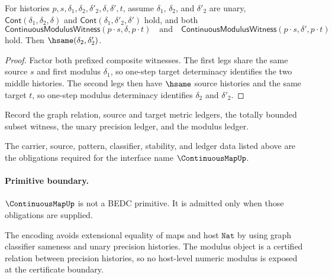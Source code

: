 \begin{theorem}
\label{thm:continuous-modulus-witness-prefixed-composite-second-deterministic}
For histories $p,s,\delta_1,\delta_2,\delta'_2,\delta,\delta',t$, assume
$\delta_1$, $\delta_2$, and $\delta'_2$ are unary,
$\mathsf{Cont}(\delta_1,\delta_2,\delta)$ and
$\mathsf{Cont}(\delta_1,\delta'_2,\delta')$ hold, and both
$$
\mathsf{ContinuousModulusWitness}(p\cdot s,\delta,p\cdot t)
\quad\text{and}\quad
\mathsf{ContinuousModulusWitness}(p\cdot s,\delta',p\cdot t)
$$
hold. Then $\hsame(\delta_2,\delta'_2)$.
\end{theorem}
\begin{proof}
Factor both prefixed composite witnesses. The first legs share the same source
$s$ and first modulus $\delta_1$, so one-step target determinacy identifies the
two middle histories. The second legs then have $\hsame$ source histories and
the same target $t$, so one-step modulus determinacy identifies $\delta_2$ and
$\delta'_2$.
\end{proof}



\begin{definition}
\label{def:continuous-ledger-policy}
Record the graph relation, source and target metric ledgers, the totally bounded subset witness, the unary precision ledger, and the modulus ledger.
\end{definition}

\begin{definition}
\label{def:continuous-certificate-obligations}
The carrier, source, pattern, classifier, stability, and ledger data listed above are the obligations required for the interface name $\ContinuousMapUp$.
\end{definition}
\paragraph{Primitive boundary.}
$\ContinuousMapUp$ is not a BEDC primitive. It is admitted only when those obligations are supplied.

\begin{remark}
\label{rem:continuous-zero-axiom-note}
The encoding avoids extensional equality of maps and host $\texttt{Nat}$ by using graph classifier sameness and unary precision histories. The modulus object is a certified relation between precision histories, so no host-level numeric modulus is exposed at the certificate boundary.
\end{remark}


